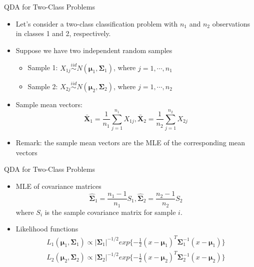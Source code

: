 \documentclass[
  ignorenonframetext,
]{beamer}
\providecommand{\tightlist}{%
  \setlength{\itemsep}{0pt}\setlength{\parskip}{0pt}}
\begin{document}
\begin{frame}{QDA for Two-Class Problems}
\protect\hypertarget{qda-for-two-class-problems-1}{}
\begin{itemize}
\item
  Let's consider a two-class classification problem with \(n_1\) and
  \(n_2\) observations in classes 1 and 2, respectively.
\item
  Suppose we have two independent random samples

  \begin{itemize}
  \tightlist
  \item
    Sample 1:
    \(X_{1j}\overset{iid}\sim N(\mathbf \mu_1, \boldsymbol \Sigma_1)\),
    where \(j=1, \cdots, n_1\)
  \item
    Sample 2:
    \(X_{2j}\overset{iid}\sim N(\mathbf \mu_2, \boldsymbol \Sigma_2)\),
    where \(j=1, \cdots, n_2\)
  \end{itemize}
\item
  Sample mean vectors:
  \[\bar {\mathbf X}_1=\frac{1}{n_1}\sum_{j=1}^{n_1}X_{1j}, 
  \bar {\mathbf X}_2=\frac{1}{n_2}\sum_{j=1}^{n_2}X_{2j}\]
\item
  Remark: the sample mean vectors are the MLE of the corresponding mean
  vectors
\end{itemize}
\end{frame}

\begin{frame}{QDA for Two-Class Problems}
\protect\hypertarget{qda-for-two-class-problems-2}{}
\begin{itemize}
\item
  MLE of covariance matrices
  \[\hat {\boldsymbol\Sigma}_1  = \frac{n_1-1}{n_1}S_1, \hat {\boldsymbol\Sigma}_2  = \frac{n_2-1}{n_2}S_2\]
  where \(S_i\) is the sample covariance matrix for sample \(i\).
\item
  Likelihood functions \[\begin{aligned}
  L_1(\boldsymbol \mu_1, \boldsymbol \Sigma_1) \propto |\boldsymbol\Sigma_1|^{-1/2} exp\{-\frac{1}{2} (x-\boldsymbol \mu_1)^T \boldsymbol \Sigma_1^{-1} (x-\boldsymbol \mu_1)\}\\
  L_2(\boldsymbol \mu_2, \boldsymbol \Sigma_2) \propto |\boldsymbol\Sigma_2|^{-1/2} exp\{-\frac{1}{2} (x-\boldsymbol \mu_2)^T \boldsymbol \Sigma_2^{-1} (x-\boldsymbol \mu_2)\}
  \end{aligned}\]
\end{itemize}
\end{frame}
\end{document}
